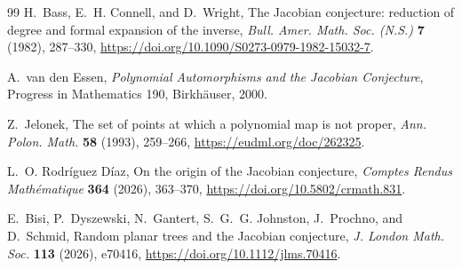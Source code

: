 \documentclass[11pt,a4paper]{article}
\theoremstyle{remark}
\begin{document}
\begin{thebibliography}{99}
H.~Bass, E.~H. Connell, and D.~Wright,
\newblock The Jacobian conjecture: reduction of degree and formal expansion
  of the inverse,
\newblock \emph{Bull. Amer. Math. Soc. (N.S.)} \textbf{7} (1982), 287--330,
\newblock \url{https://doi.org/10.1090/S0273-0979-1982-15032-7}.

A.~van den Essen,
\newblock \emph{Polynomial Automorphisms and the Jacobian Conjecture},
\newblock Progress in Mathematics 190, Birkh\"auser, 2000.

Z.~Jelonek,
\newblock The set of points at which a polynomial map is not proper,
\newblock \emph{Ann. Polon. Math.} \textbf{58} (1993), 259--266,
\newblock \url{https://eudml.org/doc/262325}.

L.~O. Rodr\'iguez D\'iaz,
\newblock On the origin of the Jacobian conjecture,
\newblock \emph{Comptes Rendus Math\'ematique} \textbf{364} (2026), 363--370,
\newblock \url{https://doi.org/10.5802/crmath.831}.

E.~Bisi, P.~Dyszewski, N.~Gantert, S.~G.~G. Johnston, J.~Prochno,
and D.~Schmid,
\newblock Random planar trees and the Jacobian conjecture,
\newblock \emph{J. London Math. Soc.} \textbf{113} (2026), e70416,
\newblock \url{https://doi.org/10.1112/jlms.70416}.

\end{thebibliography}
\end{document}
